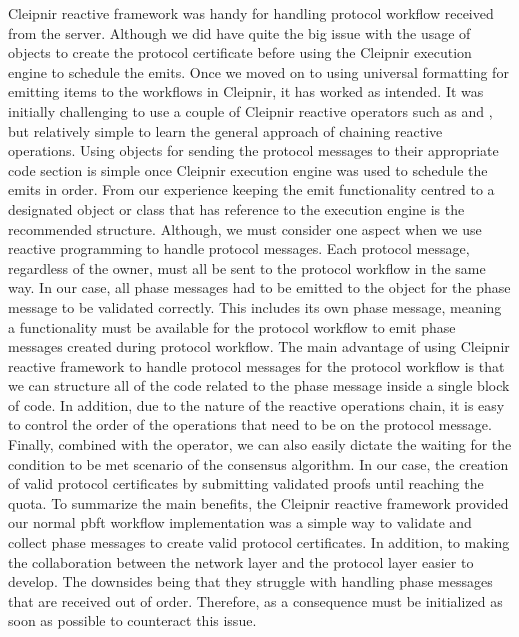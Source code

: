 Cleipnir reactive framework was handy for handling protocol workflow received from the server. Although we did have quite the big issue with the usage of  objects to create the protocol certificate before using the Cleipnir execution engine to schedule the emits. Once we moved on to using universal formatting for emitting items to the workflows in Cleipnir, it has worked as intended. It was initially challenging to use a couple of Cleipnir reactive operators such as  and , but relatively simple to learn the general approach of chaining reactive operations. Using  objects for sending the protocol messages to their appropriate code section is simple once Cleipnir execution engine was used to schedule the emits in order. From our experience keeping the emit functionality centred to a designated object or class that has reference to the execution engine is the recommended structure. Although, we must consider one aspect when we use reactive programming to handle protocol messages. Each protocol message, regardless of the owner, must all be sent to the protocol workflow in the same way. In our case, all phase messages had to be emitted to the  object for the phase message to be validated correctly. This includes its own phase message, meaning a functionality must be available for the protocol workflow to emit phase messages created during protocol workflow. The main advantage of using Cleipnir reactive framework to handle protocol messages for the protocol workflow is that we can structure all of the code related to the phase message inside a single block of code. In addition, due to the nature of the reactive operations chain, it is easy to control the order of the operations that need to be on the protocol message. Finally, combined with the  operator, we can also easily dictate the waiting for the condition to be met scenario of the consensus algorithm. In our case, the creation of valid protocol certificates by submitting validated proofs until reaching the quota.
To summarize the main benefits, the Cleipnir reactive framework provided our normal \ac{pbft} workflow implementation was a simple way to validate and collect phase messages to create valid protocol certificates.  In addition, to making the collaboration between the network layer and the protocol layer easier to develop. The downsides being that they struggle with handling phase messages that are received out of order. Therefore, as a consequence must be initialized as soon as possible to counteract this issue. 
\fi




